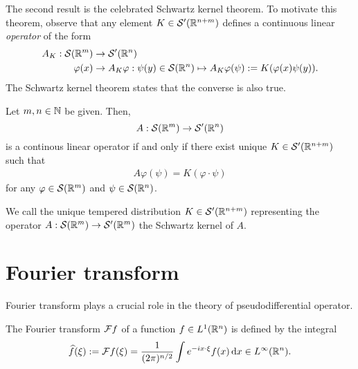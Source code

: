 \documentclass[12pt]{article}
\begin{document}
The second result is the celebrated Schwartz kernel theorem. To motivate this theorem, observe that any element $K \in \sch'(\R^{n + m})$ defines a continuous linear \textit{operator} of the form 
\begin{align*}
A_K : \sch(\R^m) &\to \sch'(\R^n)\\
\varphi(x) &\to A_K \varphi : \psi(y) \in \sch(\R^n) \mapsto A_K \varphi (\psi) := K(\varphi(x) \psi(y)). 
\end{align*}
The Schwartz kernel theorem states that the converse is also true. 
\begin{ftheorem} \label{theorem: schwartz kernel theorem}
    Let $m, n \in \N$ be given. Then, $$A : \sch(\R^m) \to \sch'(\R^n)$$ is a continous linear operator if and only if there exist unique $K \in \sch'(\R^{n + m})$ such that 
    \begin{align*}
    A\varphi(\psi) = K(\varphi \cdot \psi)
    \end{align*}
    for any $\varphi \in \sch(\R^m)$ and $\psi \in \sch(\R^n)$. 
\end{ftheorem}

We call the unique tempered distribution $K \in \sch'(\R^{n + m})$ representing the operator $A: \sch(\R^m) \to \sch'(\R^m)$ the Schwartz kernel of $A$. 


%    


\section{Fourier transform} 
Fourier transform plays a crucial role in the theory of pseudodifferential operator.
\begin{fdefinition}
    The Fourier transform $\F f$ of a function $f \in L^1(\R^n)$ is defined by the integral
    \begin{align*}
    \widehat{f}(\xi) := \F f(\xi) = \frac{1}{(2\pi)^{n/2}} \int e^{- i x \cdot \xi} f(x)\d[x] \in L^\infty(\R^n). 
    \end{align*}
\end{fdefinition}
    
\end{document}
